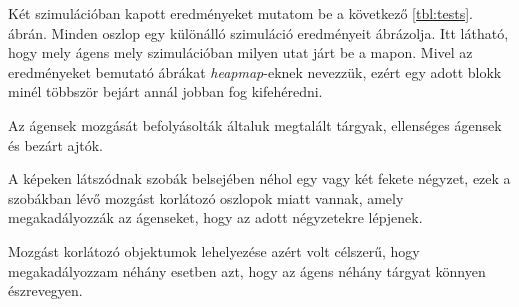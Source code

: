 Két szimulációban kapott eredményeket mutatom be a következő \ref{tbl:tests}. ábrán. Minden oszlop egy különálló szimuláció eredményeit ábrázolja. 
Itt látható, hogy mely ágens mely szimulációban milyen utat járt be a mapon. Mivel az eredményeket bemutató ábrákat \textit{heapmap}-eknek nevezzük, ezért egy adott blokk minél többször bejárt annál jobban fog kifehéredni.

Az ágensek mozgását befolyásolták általuk megtalált tárgyak, ellenséges ágensek és bezárt ajtók.

A képeken látszódnak szobák belsejében néhol egy vagy két fekete négyzet, ezek a szobákban lévő mozgást korlátozó oszlopok miatt vannak, amely megakadályozzák az ágenseket, hogy az adott négyzetekre lépjenek.

Mozgást korlátozó objektumok lehelyezése azért volt célszerű, hogy megakadályozzam néhány esetben azt, hogy az ágens néhány tárgyat könnyen észrevegyen.
